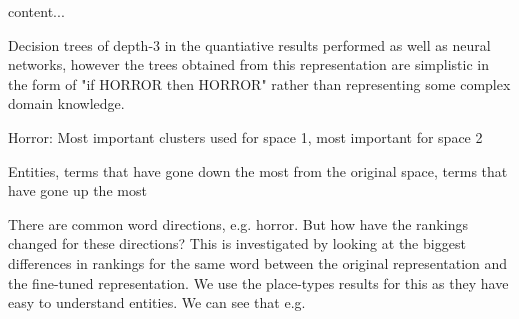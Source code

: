 
\begin{table}[]\label{difference how top directions in original rep have changed}
	content...
\end{table}
 


Decision trees of depth-3 in the quantiative results performed as well as neural networks, however the trees obtained from this representation are simplistic in the form of "if HORROR then HORROR" rather than representing some complex domain knowledge.




\begin{table}[]\label{ch5:clustersusedintrees}
	Horror: Most important clusters used for space 1, most important for space 2
\end{table}




\begin{table}[]\label{Biggest difference in entities (entities that have gone down/gone up the most) for the same directions }
	Entities, terms that have gone down the most from the original space, terms that have gone up the most
\end{table}


There are common word directions, e.g. horror. But how have the rankings changed for these directions? This is investigated by looking at the biggest differences in rankings for the same word between the original representation and the fine-tuned representation. We use the place-types results for this as they have easy to understand entities. We can see that e.g.
























